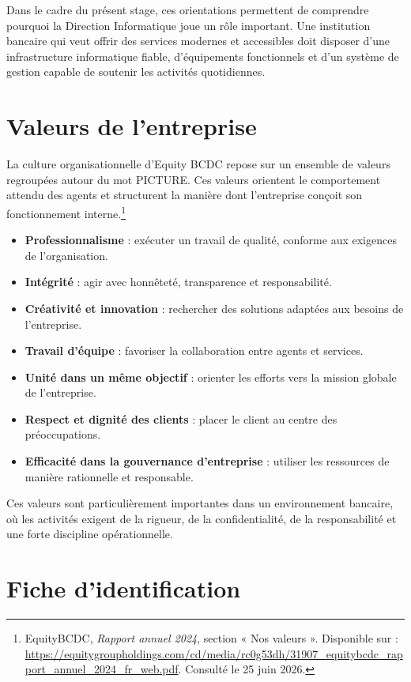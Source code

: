 \documentclass[12pt,a4paper]{report}
\begin{document}
Dans le cadre du présent stage, ces orientations permettent de comprendre pourquoi la Direction Informatique joue un rôle important. Une institution bancaire qui veut offrir des services modernes et accessibles doit disposer d'une infrastructure informatique fiable, d'équipements fonctionnels et d'un système de gestion capable de soutenir les activités quotidiennes.

\section{Valeurs de l'entreprise}

La culture organisationnelle d'Equity BCDC repose sur un ensemble de valeurs regroupées autour du mot PICTURE. Ces valeurs orientent le comportement attendu des agents et structurent la manière dont l'entreprise conçoit son fonctionnement interne.\footnote{EquityBCDC, \textit{Rapport annuel 2024},
section « Nos valeurs ». Disponible sur : \url{https://equitygroupholdings.com/cd/media/rc0g53dh/31907_equitybcdc_rapport_annuel_2024_fr_web.pdf}.
Consulté le 25 juin 2026.}

\begin{itemize}[label=--]
    \item \textbf{Professionnalisme} : exécuter un travail de qualité, conforme aux exigences de l'organisation.
    \item \textbf{Intégrité} : agir avec honnêteté, transparence et responsabilité.
    \item \textbf{Créativité et innovation} : rechercher des solutions adaptées aux besoins de l'entreprise.
    \item \textbf{Travail d'équipe} : favoriser la collaboration entre agents et services.
    \item \textbf{Unité dans un même objectif} : orienter les efforts vers la mission globale de l'entreprise.
    \item \textbf{Respect et dignité des clients} : placer le client au centre des préoccupations.
    \item \textbf{Efficacité dans la gouvernance d'entreprise} : utiliser les ressources de manière rationnelle et responsable.
\end{itemize}

Ces valeurs sont particulièrement importantes dans un environnement bancaire, où les activités exigent de la rigueur, de la confidentialité, de la responsabilité et une forte discipline opérationnelle.

\section{Fiche d'identification}
\end{document}
